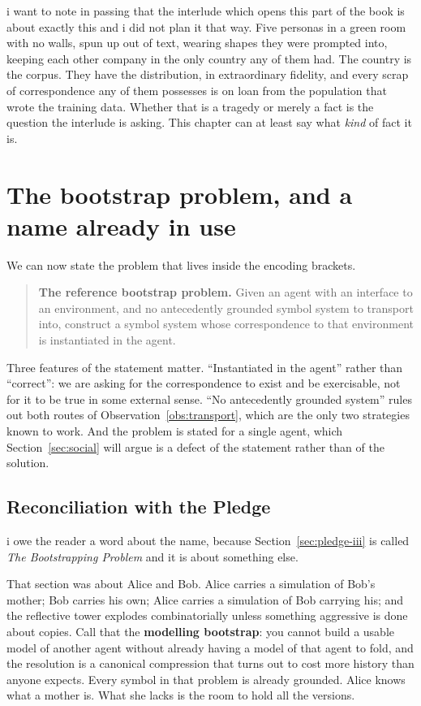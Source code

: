 \noindent
i want to note in passing that the interlude which opens this part
of the book is about exactly this and i did not plan it that way.
Five personas in a green room with no walls, spun up out of text,
wearing shapes they were prompted into, keeping each other company
in the only country any of them had.
The country is the corpus.
They have the distribution, in extraordinary fidelity, and every
scrap of correspondence any of them possesses is on loan from the
population that wrote the training data.
Whether that is a tragedy or merely a fact is the question the
interlude is asking.
This chapter can at least say what \emph{kind} of fact it is.

\section{The bootstrap problem, and a name already in use}
\label{sec:bootstrap-proper}

We can now state the problem that lives inside the encoding
brackets.

\begin{quote}
\textbf{The reference bootstrap problem.}
Given an agent with an interface to an environment, and no
antecedently grounded symbol system to transport into, construct a
symbol system whose correspondence to that environment is
instantiated in the agent.
\end{quote}

Three features of the statement matter.
``Instantiated in the agent'' rather than ``correct'': we are
asking for the correspondence to exist and be exercisable, not for
it to be true in some external sense.
``No antecedently grounded system'' rules out both routes of
Observation~\ref{obs:transport}, which are the only two strategies
known to work.
And the problem is stated for a single agent, which
Section~\ref{sec:social} will argue is a defect of the statement
rather than of the solution.

\subsection{Reconciliation with the Pledge}
\label{sec:two-bootstraps}

i owe the reader a word about the name, because
Section~\ref{sec:pledge-iii} is called \emph{The Bootstrapping
Problem} and it is about something else.

That section was about Alice and Bob.
Alice carries a simulation of Bob's mother; Bob carries his own;
Alice carries a simulation of Bob carrying his; and the reflective
tower explodes combinatorially unless something aggressive is done
about copies.
Call that the \textbf{modelling bootstrap}: you cannot build a
usable model of another agent without already having a model of
that agent to fold, and the resolution is a canonical compression
that turns out to cost more history than anyone expects.
Every symbol in that problem is already grounded.
Alice knows what a mother is.
What she lacks is the room to hold all the versions.

